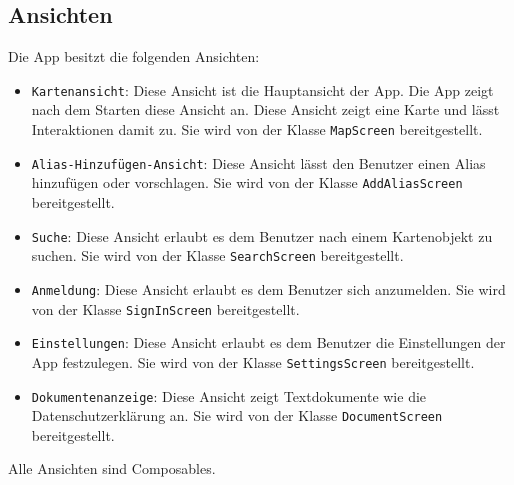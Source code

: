 \subsection{Ansichten}\label{App_Navigation_Screens}
Die App besitzt die folgenden Ansichten:
\begin{itemize}
    \item \texttt{Kartenansicht}: Diese Ansicht ist die Hauptansicht der App. Die App zeigt nach dem Starten diese Ansicht an. 
    Diese Ansicht zeigt eine Karte und lässt Interaktionen damit zu.
    Sie wird von der Klasse \texttt{MapScreen} bereitgestellt.
    \item \texttt{Alias-Hinzufügen-Ansicht}: Diese Ansicht lässt den Benutzer einen Alias hinzufügen oder vorschlagen.
    Sie wird von der Klasse \texttt{AddAliasScreen} bereitgestellt.
    \item \texttt{Suche}: Diese Ansicht erlaubt es dem Benutzer nach einem Kartenobjekt zu suchen.
    Sie wird von der Klasse \texttt{SearchScreen} bereitgestellt.
    \item \texttt{Anmeldung}: Diese Ansicht erlaubt es dem Benutzer sich anzumelden.
    Sie wird von der Klasse \texttt{SignInScreen} bereitgestellt.
    \item \texttt{Einstellungen}: Diese Ansicht erlaubt es dem Benutzer die Einstellungen der App festzulegen.
    Sie wird von der Klasse \texttt{SettingsScreen} bereitgestellt.
    \item \texttt{Dokumentenanzeige}: Diese Ansicht zeigt Textdokumente wie die Datenschutzerklärung an.
    Sie wird von der Klasse \texttt{DocumentScreen} bereitgestellt.
\end{itemize}
Alle Ansichten sind Composables.